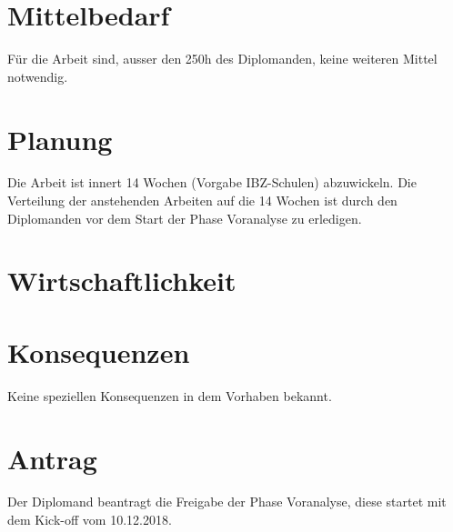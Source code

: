 \section{Mittelbedarf}
\label{sec:org06f92e4}

Für die Arbeit sind, ausser den 250h des Diplomanden, keine weiteren
Mittel notwendig.

\section{Planung}
\label{sec:orgf74b04c}

Die Arbeit ist innert 14 Wochen (Vorgabe IBZ-Schulen) abzuwickeln. Die
Verteilung der anstehenden Arbeiten auf die 14 Wochen ist durch den
Diplomanden vor dem Start der Phase Voranalyse zu erledigen.

\section{Wirtschaftlichkeit}
\label{sec:org806cf92}

\section{Konsequenzen}
\label{sec:org579a335}

Keine speziellen Konsequenzen in dem Vorhaben bekannt.

\section{Antrag}
\label{sec:orgc2405c9}

Der Diplomand beantragt die Freigabe der Phase Voranalyse, diese
startet mit dem Kick-off vom 10.12.2018.
